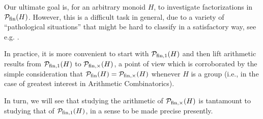 Our ultimate goal is, for an arbitrary monoid $H$, to investigate factorizations in $\mathcal{P}_{\textrm{fin}}(H)$. However, this is a difficult task in general, due to a variety of ``pathological situations'' that might be hard to classify in a satisfactory way, see e.g. \cite[Remark 3.3(ii)]{fan-tringali18}.

In practice, it is more convenient to start with $\mathcal{P}_{\textrm{fin}, 1}(H)$ and then lift arithmetic results from $\mathcal{P}_{\textrm{fin}, 1}(H)$ to $\mathcal{P}_{\textrm{fin}, \times}(H)$, a point of view which is corroborated by the simple consideration that $\mathcal{P}_{\textrm{fin}}(H) = \mathcal{P}_{\textrm{fin}, \times}(H)$ whenever $H$ is a group (i.e., in the case of greatest interest in Arithmetic Combinatorics).

In turn, we will see that studying the arithmetic of $\mathcal{P}_{\textrm{fin}, \times}(H)$ is tantamount to studying that of $\mathcal{P}_{\textrm{fin}, 1}(H)$, in a sense to be made precise presently.

